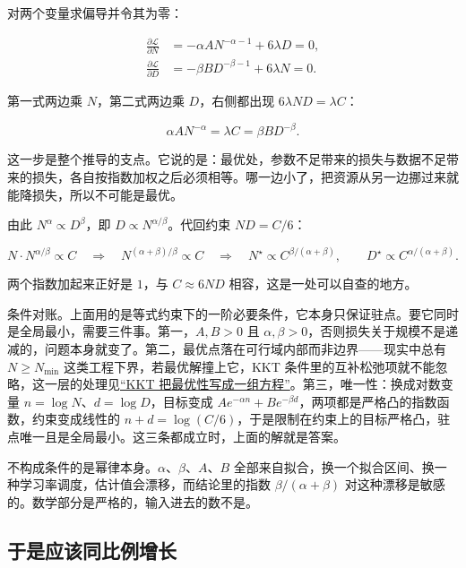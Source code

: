 对两个变量求偏导并令其为零：

\[
  \begin{aligned}
    \frac{\partial \mathcal{L}}{\partial N} &= -\alpha A N^{-\alpha-1} + 6\lambda D = 0, \\[2pt]
    \frac{\partial \mathcal{L}}{\partial D} &= -\beta B D^{-\beta-1} + 6\lambda N = 0 .
  \end{aligned}
\]

第一式两边乘 \(N\)，第二式两边乘 \(D\)，右侧都出现 \(6\lambda ND = \lambda C\)：

\[
  \alpha A N^{-\alpha} = \lambda C = \beta B D^{-\beta}.
\]

这一步是整个推导的支点。它说的是：最优处，参数不足带来的损失与数据不足带来的损失，各自按指数加权之后必须相等。哪一边小了，把资源从另一边挪过来就能降损失，所以不可能是最优。

由此 \(N^{\alpha} \propto D^{\beta}\)，即 \(D \propto N^{\alpha/\beta}\)。代回约束 \(ND = C/6\)：

\[
  N \cdot N^{\alpha/\beta} \propto C
  \quad\Longrightarrow\quad
  N^{(\alpha+\beta)/\beta} \propto C
  \quad\Longrightarrow\quad
  N^\star \propto C^{\beta/(\alpha+\beta)},
  \qquad
  D^\star \propto C^{\alpha/(\alpha+\beta)} .
\]

两个指数加起来正好是 \(1\)，与 \(C \approx 6ND\) 相容，这是一处可以自查的地方。

\begin{remark}
条件对账。上面用的是等式约束下的一阶必要条件，它本身只保证驻点。要它同时是全局最小，需要三件事。第一，\(A, B > 0\) 且 \(\alpha, \beta > 0\)，否则损失关于规模不是递减的，问题本身就变了。第二，最优点落在可行域内部而非边界——现实中总有 \(N \ge N_{\min}\) 这类工程下界，若最优解撞上它，KKT 条件里的互补松弛项就不能忽略，这一层的处理见\hyperref[sec:09-Convex-Optimization/05-Duality/03]{``KKT 把最优性写成一组方程''}。第三，唯一性：换成对数变量 \(n = \log N\)、\(d = \log D\)，目标变成 \(A e^{-\alpha n} + B e^{-\beta d}\)，两项都是严格凸的指数函数，约束变成线性的 \(n + d = \log(C/6)\)，于是限制在约束上的目标严格凸，驻点唯一且是全局最小。这三条都成立时，上面的解就是答案。

不构成条件的是幂律本身。\(\alpha\)、\(\beta\)、\(A\)、\(B\) 全部来自拟合，换一个拟合区间、换一种学习率调度，估计值会漂移，而结论里的指数 \(\beta/(\alpha+\beta)\) 对这种漂移是敏感的。数学部分是严格的，输入进去的数不是。
\end{remark}

\subsection{于是应该同比例增长}

